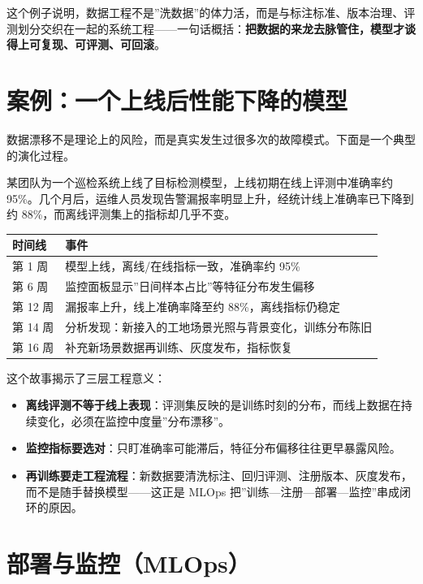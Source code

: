 \documentclass[
]{ctexbook}
\providecommand{\tightlist}{\setlength{\itemsep}{0pt}\setlength{\parskip}{0pt} }
\newcounter{none}
\begin{document}
这个例子说明，数据工程不是''洗数据''的体力活，而是与标注标准、版本治理、评测划分交织在一起的系统工程------一句话概括：\textbf{把数据的来龙去脉管住，模型才谈得上可复现、可评测、可回滚}。

\section{案例：一个上线后性能下降的模型}\label{ux6848ux4f8bux4e00ux4e2aux4e0aux7ebfux540eux6027ux80fdux4e0bux964dux7684ux6a21ux578b}

数据漂移不是理论上的风险，而是真实发生过很多次的故障模式。下面是一个典型的演化过程。

某团队为一个巡检系统上线了目标检测模型，上线初期在线上评测中准确率约
95\%。几个月后，运维人员发现告警漏报率明显上升，经统计线上准确率已下降到约
88\%，而离线评测集上的指标却几乎不变。

{\def\LTcaptype{none} %
\begin{longtable}[]{@{}ll@{}}
\toprule\noalign{}
时间线 & 事件 \\
\midrule\noalign{}
\endhead
\bottomrule\noalign{}
\endlastfoot
第 1 周 & 模型上线，离线/在线指标一致，准确率约 95\% \\
第 6 周 & 监控面板显示''日间样本占比''等特征分布发生偏移 \\
第 12 周 & 漏报率上升，线上准确率降至约 88\%，离线指标仍稳定 \\
第 14 周 & 分析发现：新接入的工地场景光照与背景变化，训练分布陈旧 \\
第 16 周 & 补充新场景数据再训练、灰度发布，指标恢复 \\
\end{longtable}
}

这个故事揭示了三层工程意义：

\begin{itemize}
\tightlist
\item
  \textbf{离线评测不等于线上表现}：评测集反映的是训练时刻的分布，而线上数据在持续变化，必须在监控中度量''分布漂移''。
\item
  \textbf{监控指标要选对}：只盯准确率可能滞后，特征分布偏移往往更早暴露风险。
\item
  \textbf{再训练要走工程流程}：新数据要清洗标注、回归评测、注册版本、灰度发布，而不是随手替换模型------这正是
  MLOps 把''训练---注册---部署---监控''串成闭环的原因。
\end{itemize}

\section{部署与监控（MLOps）}\label{ux90e8ux7f72ux4e0eux76d1ux63a7mlops}
\end{document}
